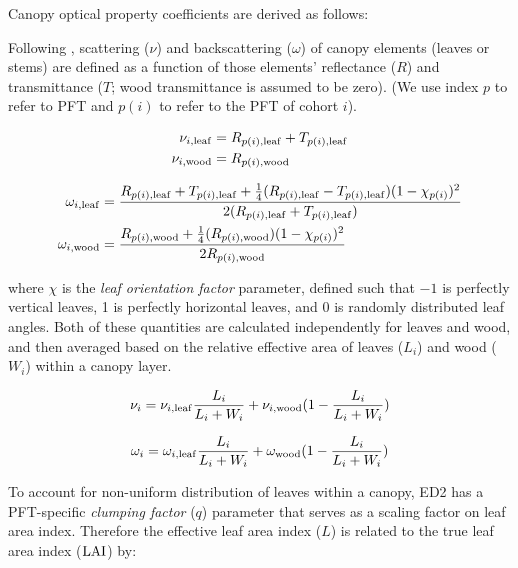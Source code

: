 Canopy optical property coefficients are derived as follows:

Following \citet{clm45_note}, scattering ($\nu$) and backscattering ($\omega$) of canopy elements (leaves or stems) are defined as a function of those elements' reflectance ($R$) and transmittance ($T$; wood transmittance is assumed to be zero).
(We use index $p$ to refer to PFT and $p(i)$ to refer to the PFT of cohort $i$).

\begin{align}
  \begin{split}
    \nu_{i, \mathrm{leaf}} &= R_{p(i), \mathrm{leaf}} + T_{p(i), \mathrm{leaf}}\\
    \nu_{i, \mathrm{wood}} &= R_{p(i), \mathrm{wood}}\\
  \end{split}
\end{align}

\begin{align}
  \begin{split}
    \omega_{i, \mathrm{leaf}} &= \frac{R_{p(i), \mathrm{leaf}} + T_{p(i), \mathrm{leaf}} + \frac{1}{4} (R_{p(i), \mathrm{leaf}}-T_{p(i), \mathrm{leaf}})(1 - \chi_{p(i)})^2}{2 (R_{p(i), \mathrm{leaf}}+T_{p(i), \mathrm{leaf}})}\\
    \omega_{i, \mathrm{wood}} &= \frac{R_{p(i), \mathrm{wood}} + \frac{1}{4} (R_{p(i), \mathrm{wood}})(1 - \chi_{p(i)})^2}{2 R_{p(i), \mathrm{wood}}}
  \end{split}
\end{align}

where $\chi$ is the \emph{leaf orientation factor} parameter, defined such that $-1$ is perfectly vertical leaves, 1 is perfectly horizontal leaves, and 0 is randomly distributed leaf angles.
Both of these quantities are calculated independently for leaves and wood, and then averaged based on the relative effective area of leaves ($L_{i}$) and wood ($W_{i}$) within a canopy layer.

\begin{equation}
  \nu_{i} = \nu_{i, \mathrm{leaf}} \frac{L_{i}}{L_{i} + W_{i}} + \nu_{i, \mathrm{wood}} (1 - \frac{L_{i}}{L_{i} + W_{i}})
\end{equation}

\begin{equation}
  \omega_{i} = \omega_{i, \mathrm{leaf}} \frac{L_{i}}{L_{i} + W_{i}} + \omega_{\mathrm{wood}} (1 - \frac{L_{i}}{L_{i} + W_{i}})
\end{equation}

To account for non-uniform distribution of leaves within a canopy, ED2 has a PFT-specific \emph{clumping factor} ($q$) parameter that serves as a scaling factor on leaf area index.
Therefore the effective leaf area index ($L$) is related to the true leaf area index ($\mathrm{LAI}$) by:

